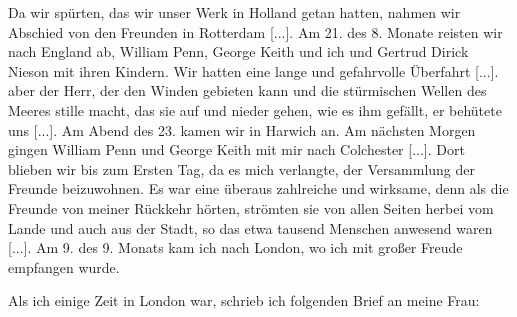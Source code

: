 Da wir spürten, das wir unser Werk in Holland getan
hatten, nahmen wir Abschied von den Freunden in Rotterdam [...].
Am 21. des 8. Monate reisten wir nach England ab, William
Penn, George 
Keith und ich und Gertrud Dirick 
Nieson mit ihren
Kindern. Wir hatten eine lange und gefahrvolle Überfahrt [...].
aber der Herr, der den Winden gebieten kann und die stürmischen
Wellen des Meeres stille macht, das sie auf und nieder gehen,
wie es ihm gefällt, er behütete uns [...]. Am Abend des 23.
kamen wir in Harwich an. Am nächsten Morgen gingen William
Penn und George Keith mit mir nach Colchester [...]. Dort blieben
wir bis zum Ersten Tag, da es mich verlangte, der Versammlung
der Freunde beizuwohnen. Es war eine überaus zahlreiche und
wirksame, denn als die Freunde von meiner Rückkehr hörten,
strömten sie von allen Seiten herbei vom Lande und auch aus
der Stadt, so das etwa tausend Menschen anwesend waren [...].
Am 9. des 9. Monats kam ich nach London, wo ich mit großer
Freude empfangen wurde.

Als ich einige Zeit in London war, schrieb ich folgenden Brief
an meine Frau:


